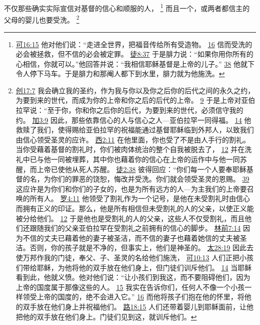 \documentclass[12pt, a4paper, oneside]{ctexart}
\newcounter{parnum}[section]
\newcommand{\N}{%
   \noindent\refstepcounter{parnum}%
    \makebox[\parindent][l]{\textbf{\arabic{parnum}.}}}
\begin{document}
\N 不仅那些确实实际宣信对基督的信心和顺服的人，
	\footnote {
		\href{https://biblehub.com/mark/16-15.htm}{可16:15} 他对他们说：“走进全世界，把福音传给所有受造物。
		\href{https://biblehub.com/mark/16-16.htm}{16} 信而受洗的必会被拯救，但不信的必会被定罪。
		\href{https://biblehub.com/acts/8-37.htm}{徒8:37} 于是腓力说：“如果你用你所有的心相信，你就可以。”他回答并说：“我相信耶稣基督是上帝的儿子。”
		\href{https://biblehub.com/acts/8-38.htm}{38} 他就下令人停下马车。于是腓力和那阉人都下到水里，腓力就为他施洗。
	}
	而且一个，或两者都信主的父母的婴儿也要受洗。
	\footnote {
		\href{https://biblehub.com/genesis/17-7.htm}{创17:7} 我会确立我的圣约，作为我与你以及你之后你的后代之间的永久之约，为要到来的世代，而成为你的上帝和你之后的后代的上帝。
		\href{https://biblehub.com/genesis/17-9.htm}{9} 于是上帝对亚伯拉罕说：“至于你，你和你之后你的后代，为要到来的世代，必须信守我的约。
		\href{https://biblehub.com/galatians/3-9.htm}{加3:9} 因此，那些依靠信心的人与信心之人---亚伯拉罕一同得福。
		\href{https://biblehub.com/galatians/3-14.htm}{14} 他救赎了我们，使得赐给亚伯拉罕的祝福能通过基督耶稣临到外邦人，以致我们由信心领受圣灵的应许。
		\href{https://biblehub.com/colossians/2-11.htm}{西2:11} 在他里面，你也受了不是由人手行的割礼。当你受藉着基督的割礼时，你们被肉体统治的整个自我被脱去了，
		\href{https://biblehub.com/colossians/2-12.htm}{12} 并在洗礼中已与他一同被埋葬，其中你也藉着你的信心在上帝的运作中与他一同苏醒，而上帝已使他从死人苏醒。
		\href{https://biblehub.com/acts/2-38.htm}{徒2:38} 彼得回应：“你们每一个人要奉耶稣基督的名，为你们的罪恶的饶恕，悔改并受洗。你们就会领受圣灵的恩赐。
		\href{https://biblehub.com/acts/2-39.htm}{39} 这应许是为你们和你们的子女的，也是为所有远方的人---为主我们的上帝要召唤的所有人。
		\href{https://biblehub.com/romans/4-11.htm}{罗4:11} 他领受了割礼作为一个记号，是他在未受割礼时由信心而拥有正义的印证。那么，他是所有相信但未受割礼的人的父亲，以使正义能被分给他们。
		\href{https://biblehub.com/romans/4-12.htm}{12} 于是他也是受割礼的人的父亲，这些人不仅受割礼，而且他们还跟随我们的父亲亚伯拉罕在受割礼之前拥有的信心的脚步。
		\href{https://biblehub.com/1_corinthians/7-14.htm}{林前7:14} 因为不信的丈夫已藉着他的妻子被圣洁，而不信的妻子也藉着她信的丈夫被圣洁。否则，你的孩子就是不净的，但事实上，他们是神圣的。
		\href{https://biblehub.com/matthew/28-19.htm}{太28:19} 因此去使万邦作我的门徒，奉父、子、圣灵的名给他们施洗，
		\href{https://biblehub.com/mark/10-13.htm}{可10:13} 人们正把小孩们带给耶稣，为他将他的双手放在他们身上，但门徒们训斥他们。
		\href{https://biblehub.com/mark/10-14.htm}{14} 当耶稣看到此，他就义愤。他对他们说：“让小孩们到我这，而不要阻碍他们，因为上帝的国度属于那像这些的人。
		\href{https://biblehub.com/mark/10-15.htm}{15} 我实在告诉你们，任何人不像一个小孩一样领受上帝的国度的，绝不会进入它。”
		\href{https://biblehub.com/mark/10-16.htm}{16} 而他将孩子们抱在他的怀里，将他的双手放在他们身上并祝福他们。
		\href{https://biblehub.com/luke/18-15.htm}{路18:15} 人们还带着婴儿到耶稣面前，让他把他的双手放在他们身上。门徒们见到这，就训斥他们。
	}
\end{document}
